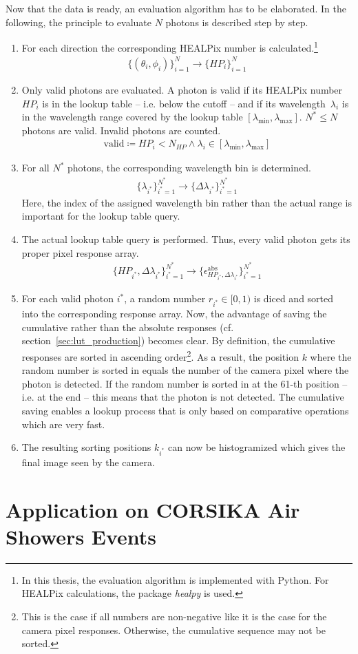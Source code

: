 Now that the data is ready, an evaluation algorithm has to be elaborated. In the following, the principle to evaluate $N$ photons is described step by step.

\begin{enumerate}
	\item For each direction the corresponding HEALPix number is calculated.\footnote{In this thesis, the evaluation algorithm is implemented with Python. For HEALPix calculations, the package \textit{healpy} is used.}
	\begin{align}
		\{(\theta_i, \phi_i)\}_{i=1}^N \rightarrow \{HP_i\}_{i=1}^N
	\end{align}
	\item Only valid photons are evaluated. A photon is valid if its HEALPix number~$HP_i$ is in the lookup table -- i.e. below the cutoff -- and if its wavelength~$\lambda_i$ is in the wavelength range covered by the lookup table $[\lambda_\text{min},\lambda_\text{max}]$. $N^\ast\leq N$ photons are valid. Invalid photons are counted.
	\begin{align}
		\text{valid} \coloneqq HP_i < N_{HP} \wedge \lambda_i \in [\lambda_\text{min},\lambda_\text{max}]
	\end{align} 
	\item For all $N^\ast$ photons, the corresponding wavelength bin is determined.
	\begin{align}
		\{\lambda_{i^\ast}\}_{i^\ast=1}^{N^\ast} \rightarrow \{ \Delta\lambda_{i^\ast} \}_{i^\ast=1}^{N^\ast}
	\end{align}
	Here, the index of the assigned wavelength bin rather than the actual range is important for the lookup table query.
	\item The actual lookup table query is performed. Thus, every valid photon gets its proper pixel response array.
	\begin{align}
		\{HP_{i^\ast}, \Delta\lambda_{i^\ast}\}_{i^\ast=1}^{N^\ast} \rightarrow \{ \epsilon^\text{abs}_{HP_{i^\ast},\Delta\lambda_{i^\ast}}\}_{i^\ast=1}^{N^\ast}
	\end{align}
	\item For each valid photon $i^\ast$, a random number $r_{i^\ast}\in[0,1)$ is diced and sorted into the corresponding response array. Now, the advantage of saving the cumulative rather than the absolute responses (cf. section~\ref{sec:lut_production}) becomes clear. By definition, the cumulative responses are sorted in ascending order\footnote{This is the case if all numbers are non-negative like it is the case for the camera pixel responses. Otherwise, the cumulative sequence may not be sorted.}. As a result, the position $k$ where the random number is sorted in equals the number of the camera pixel where the photon is detected. If the random number is sorted in at the \num{61}-th position -- i.e. at the end -- this means that the photon is not detected. The cumulative saving enables a lookup process that is only based on comparative operations which are very fast.
	\item The resulting sorting positions $k_{i^\ast}$ can now be histogramized which gives the final image seen by the camera.
\end{enumerate}

\section{Application on CORSIKA Air Showers Events}
